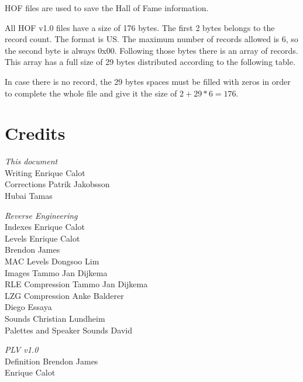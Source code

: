 \documentclass{article}
\begin{document}
 HOF files are used to save the Hall of Fame information.

 All HOF v1.0 files have a size of 176 bytes. The first 2 bytes belongs to
 the record count. The format is US. The maximum number of records allowed
 is 6, so the second byte is always 0x00.
 Following those bytes there is an array of records. This array has a full
 size of 29 bytes distributed according to the following table.


 In case there is no record, the 29 bytes spaces must be filled with zeros
 in order to complete the whole file and give it the size of $2+29*6 = 176$.

\pagebreak[3]
\section{Credits}
\begin{center}
\parbox{11.6cm}{
\raggedright {\it This document} \\
  Writing                     \dotfill Enrique Calot \\
  Corrections                 \dotfill Patrik Jakobsson \\
                           \raggedleft Hubai Tamas \\ 
\bigskip
\pagebreak[2]
\raggedright {\it Reverse Engineering} \\
  Indexes                     \dotfill Enrique Calot \\
  Levels                      \dotfill Enrique Calot \\
                           \raggedleft Brendon James \\
  MAC Levels                  \dotfill Dongsoo Lim \\
  Images                      \dotfill Tammo Jan Dijkema \\
  RLE Compression             \dotfill Tammo Jan Dijkema \\
  LZG Compression             \dotfill Anke Balderer \\
                           \raggedleft Diego Essaya \\
  Sounds                      \dotfill Christian Lundheim \\
  Palettes and Speaker Sounds \dotfill David \\
\bigskip
\pagebreak[2]
\raggedright {\it PLV v1.0} \\
  Definition                  \dotfill Brendon James \\
                           \raggedleft Enrique Calot \\
}
\end{center}
\end{document}
